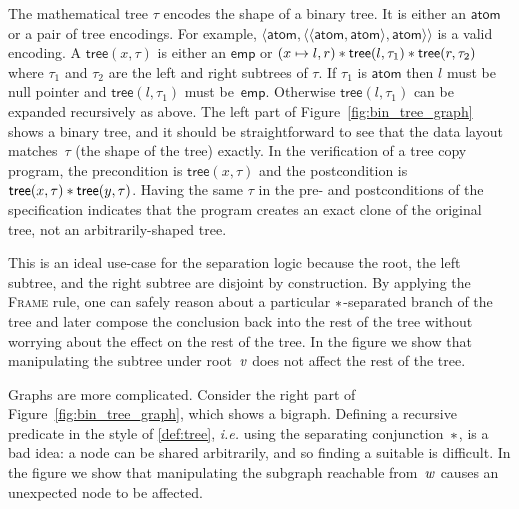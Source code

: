 The mathematical tree $\tau$ encodes the
shape of a binary tree. It is either an $\mathsf{atom}$ or a pair of
tree encodings. For example,
$\langle \mathsf{atom}, \langle \langle \mathsf{atom}, \mathsf{atom} \rangle, \mathsf{atom} \rangle \rangle$
is a valid encoding. A $\mathsf{tree}(x, \tau)$ is either an
$\mathsf{emp}$ or $(x \mapsto
l,r) \mathbin{\ast} \mathsf{tree}(l, \tau_1) \mathbin{\ast} \mathsf{tree}(r, \tau_2)$
where $\tau_1$ and $\tau_2$ are the left and right subtrees of $\tau$.
If $\tau_1$ is $\mathsf{atom}$ then $l$ must be null pointer and
$\mathsf{tree}(l, \tau_1)$ must be~$\mathsf{emp}$.
Otherwise $\mathsf{tree}(l, \tau_1)$ can be expanded recursively as above.
The left part of Figure~\ref{fig:bin_tree_graph} shows a binary tree, 
and it should be straightforward to see that the data layout matches~$\tau$ 
(the shape of the tree) exactly. In the verification of a tree
copy program, the precondition is $\mathsf{tree}(x, \tau)$ and the
postcondition is
$\mathsf{tree}(x, \tau) \mathbin{\ast} \mathsf{tree}(y, \tau)$. 
Having the same $\tau$ in the pre- and postconditions
of the specification indicates that the program creates an exact clone
of the original tree, not an arbitrarily-shaped tree.

This is an ideal use-case for the separation logic
because the root, the left subtree, 
and the right subtree are disjoint by construction. By applying
the \textsc{Frame} rule, one can safely reason about a particular 
$\mathbin{\ast}$-separated branch of the tree and later compose the 
conclusion back into the rest of the tree
without worrying about the effect on the rest of the tree. 
In the figure we show that manipulating the subtree under 
root~$\mathit{v}$ does not affect the rest of the tree.

Graphs are more complicated.
Consider the right part of Figure~\ref{fig:bin_tree_graph},
which shows a bigraph. 
Defining a recursive predicate in the style of \eqref{def:tree},
\emph{i.e.} using the separating conjunction~$\mathbin{\ast}$, is a bad idea: 
a node can be shared arbitrarily, and so finding a suitable 
 is difficult. 
In the figure we show that manipulating the subgraph reachable 
from~$\mathit{w}$ causes an unexpected node to be affected.

\begin{figure}[b]%
\centering
\begin{minipage}{.5\textwidth}
  \centering
  
  \label{fig:bin_tree_graph}
\end{minipage}%
\begin{minipage}{.5\textwidth}
  \centering
  \vspace*{0.5em}
  
  \vspace*{1em}
  \label{fig:single:cell}
\end{minipage}
\end{figure}

